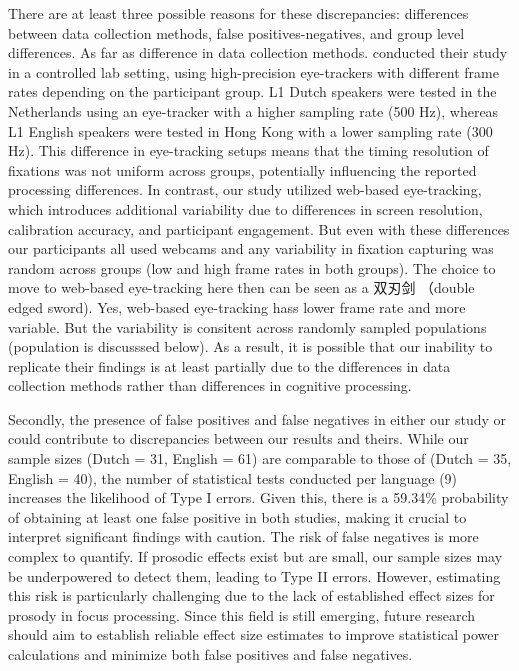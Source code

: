 There are at least three possible reasons for these discrepancies: differences between data collection methods, false positives-negatives, and group level differences. As far as difference in data collection methods. \cite{Ge2021} conducted their study in a controlled lab setting, using high-precision eye-trackers with different frame rates depending on the participant group. L1 Dutch speakers were tested in the Netherlands using an eye-tracker with a higher sampling rate (500 Hz), whereas L1 English speakers were tested in Hong Kong with a lower sampling rate (300 Hz). This difference in eye-tracking setups means that the timing resolution of fixations was not uniform across groups, potentially influencing the reported processing differences. In contrast, our study utilized web-based eye-tracking, which introduces additional variability due to differences in screen resolution, calibration accuracy, and participant engagement. But even with these differences our participants all used webcams and any variability in fixation capturing was random across groups (low and high frame rates in both groups). The choice to move to web-based eye-tracking here then can be seen as a 双刃剑 （double edged sword). Yes, web-based eye-tracking hass lower frame rate and more variable. But the variability is consitent across randomly sampled populations (population is discusssed below). As a result, it is possible that our inability to replicate their findings is at least partially due to the differences in data collection methods rather than differences in cognitive processing.

Secondly, the presence of false positives and false negatives in either our study or \citep{Ge2021} could contribute to discrepancies between our results and theirs. While our sample sizes (Dutch = 31, English = 61) are comparable to those of \citep{Ge2021} (Dutch = 35, English = 40), the number of statistical tests conducted per language (9) increases the likelihood of Type I errors. Given this, there is a 59.34\% probability of obtaining at least one false positive in both studies, making it crucial to interpret significant findings with caution. The risk of false negatives is more complex to quantify. If prosodic effects exist but are small, our sample sizes may be underpowered to detect them, leading to Type II errors. However, estimating this risk is particularly challenging due to the lack of established effect sizes for prosody in focus processing. Since this field is still emerging, future research should aim to establish reliable effect size estimates to improve statistical power calculations and minimize both false positives and false negatives.

